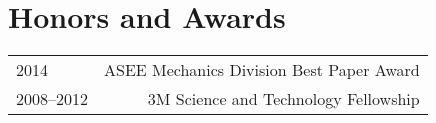 \section*{Honors and Awards}
\begin{tabular}{L!{\VRule}R}
2014&ASEE Mechanics Division Best Paper Award\\
2008--2012&3M Science and Technology Fellowship\\
\end{tabular}